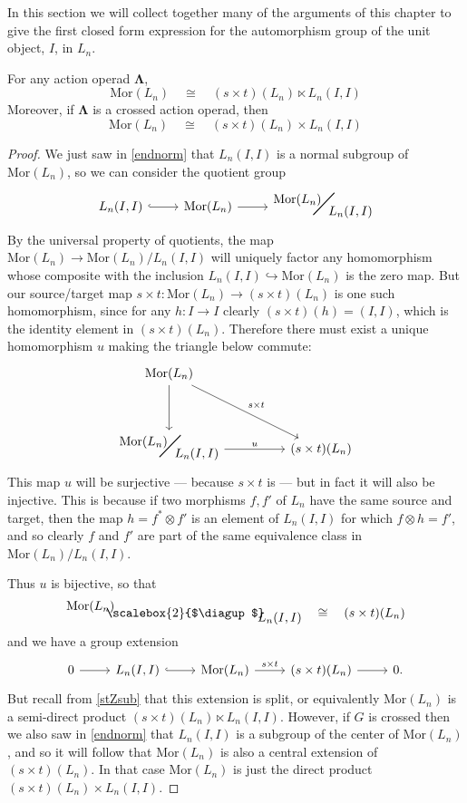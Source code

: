 \documentclass{amsbook} %
\newcommand{\ML}{\mathbf{\Lambda}}
\newcommand{\MorLn}{\mathrm{Mor}(L_n)}
\newcommand{\bigquotient}[2]{ \raisebox{0.75\height}{$#1$} \mkern-12mu\scalebox{2}{$\diagup$}\mkern-10mu \raisebox{-0.5\height}{$#2$} }
\numberwithin{section}{chapter}
\begin{document}
In this section we will collect together many of the arguments of this chapter to give the first closed form expression for the automorphism group of the unit object, $I$, in $L_n$.
\begin{prop} \label{morprod} For any action operad $\ML$,
\[ \MorLn \quad \cong \quad (s \times t)(L_n) \ltimes L_n(I,I) \]
Moreover, if $\ML$ is a crossed action operad, then
\[ \MorLn \quad \cong \quad (s \times t)(L_n) \times L_n(I,I) \]
\end{prop}
\begin{proof}
We just saw in \cref{endnorm} that $L_n(I,I)$ is a normal subgroup of $\MorLn$, so we can consider the quotient group
\[ \begin{tikzcd}
L_n(I,I) \ar[r, hookrightarrow] & \MorLn \ar[r] & \bigquotient{\MorLn}{L_n(I,I)}
\end{tikzcd} \]
By the universal property of quotients, the map $\MorLn \to \MorLn / L_n(I,I)$ will uniquely factor any homomorphism whose composite with the inclusion $L_n(I,I) \hookrightarrow \MorLn$ is the zero map. But our source/target map $s \times t : \MorLn \to (s \times t)(L_n)$ is one such homomorphism, since for any $h: I \to I$ clearly $(s \times t)(h) = (I, I)$, which is the identity element in $(s \times t)(L_n)$. Therefore there must exist a unique homomorphism $u$ making the triangle below commute:
\[ \begin{tikzcd}
\MorLn \ar[dd] \ar[ddrr, "s \times t"] & & \\
& & \\
\bigquotient{\MorLn}{L_n(I,I)} \ar[rr, "u"] & & (s \times t)(L_n)
\end{tikzcd} \]
This map $u$ will be surjective --- because $s \times t$ is --- but in fact it will also be injective. This is because if two morphisms $f, f'$ of $L_n$ have the same source and target, then the map $h = f^* \otimes f'$ is an element of $L_n(I,I)$ for which $f \otimes h = f'$, and so clearly $f$ and $f'$ are part of the same equivalence class in $\MorLn/L_n(I,I)$. 

Thus $u$ is bijective, so that
\[ \bigquotient{\MorLn}{L_n(I,I)} \quad \cong \quad (s \times t)(L_n) \]
and we have a group extension
\[ \begin{tikzcd}
0 \ar[r] & L_n(I,I) \ar[r, hookrightarrow] & \MorLn \ar[r, "s \times t"] & (s \times t)(L_n) \ar[r] & 0.
\end{tikzcd} \]
But recall from \cref{stZsub} that this extension is split, or equivalently $\MorLn$ is a semi-direct product $(s \times t)(L_n) \ltimes L_n(I,I)$. However, if $G$ is crossed then we also saw in \cref{endnorm} that $L_n(I,I)$ is a subgroup of the center of $\MorLn$, and so it will follow that $\MorLn$ is also a central extension of $(s \times t)(L_n)$. In that case $\MorLn$ is just the direct product $(s \times t)(L_n) \times L_n(I,I)$.
\end{proof}
\end{document}
